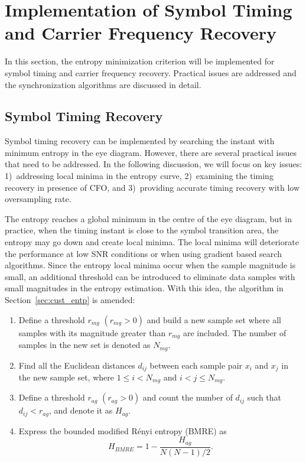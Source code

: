\documentclass[journal,comsoc, onecolumn, 12pt,draftclsnofoot]{IEEEtran} %
\begin{document}
\section{Implementation of Symbol Timing and Carrier Frequency Recovery}
\label{sec:imple}
In this section, the entropy minimization criterion will be implemented for symbol timing and carrier frequency recovery.
Practical issues are addressed and the
synchronization algorithms are discussed in detail. 

\subsection{Symbol Timing Recovery} 
\label{sec:timing}
Symbol timing recovery can be implemented by searching the instant with minimum entropy in the eye diagram.
However, there are several practical issues that need to be addressed.
In the following discussion, we will focus on key issues: 
1)~addressing local minima in the entropy curve,  
2)~examining the timing recovery in presence of CFO, and 
3)~providing accurate timing recovery with low oversampling rate.

The entropy reaches a global minimum in the centre of the eye diagram, but in practice, when the timing instant is close to the symbol transition area, the entropy may go down and create local minima. 
The local minima will deteriorate the performance at low SNR conditions or when using gradient based search algorithms.
Since the entropy local minima occur when the sample magnitude is small, an additional threshold can be introduced to eliminate data samples with small magnitudes in the entropy estimation.
With this idea, the algorithm in Section~\ref{sec:cust_entp} is amended:

\begin{enumerate}
\item Define a threshold \(r_{mg}\) \((r_{mg}>0)\) and build a new sample set where all samples with its magnitude greater than \(r_{mg}\) are included.
The number of samples in the new set is denoted as \(N_{mg}\).
\item Find all the Euclidean distances \(d_{ij}\) between each sample pair \(x_i\) and \(x_j\) in the new sample set, where \(1\le i<N_{mg}\) and \( i<j \le N_{mg}\). 
\item Define a threshold \(r_{ag}\) \((r_{ag}>0)\) and count the number of \(d_{ij}\) such that $d_{ij}<r_{ag}$, and denote it as $H_{ag}$.
\item Express the bounded modified R\'enyi entropy (BMRE) as
\begin{equation}
H_{BMRE}= 1- \frac{ H_{ag}}{ N(N-1)/2}.
\label{eq:entorpy_ad2}
\end{equation}
\end{enumerate}
\end{document}
